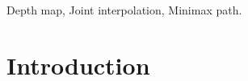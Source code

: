 \documentclass[preprint,10pt,5p,times,twocolumn]{elsarticle}
\begin{document}
\begin{frontmatter}
\begin{keyword}


Depth map, Joint interpolation, Minimax path.

\end{keyword}

\end{frontmatter}


\section{Introduction}

\end{document}
